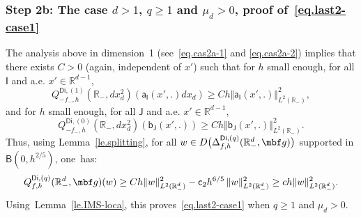 \subsubsection*{Step 2b: The case $d>1$, $q \ge 1$ and $\mu_{d}>0$, proof of~\eqref{eq.last2-case1}}
The analysis above in dimension~1 (see~\eqref{eq.cas2a-1} and
\eqref{eq.cas2a-2}) implies that there exists $C>0$ (again,
independent of $x'$) such that for $h$ small enough, for all $\mathsf I$ and a.e. $x'\in \mathbb R^{d-1}$,
\[
Q^{\mathsf{Di},(1)}_{-f_-,h}(\mathbb R_-,dx_d^2) (\mathsf a_{\mathsf I}(x',.)dx_d) \ge Ch \Vert \mathsf a_{\mathsf I}(x',.) \Vert_{L^2(\mathbb R_-)}^2,
\]
and for $h$ small enough, for all $\mathsf J$ and a.e. $x'\in \mathbb R^{d-1}$,
\[
Q^{\mathsf{Di},(0)}_{-f_-,h}(\mathbb R_-,dx_d^2) (\mathsf b_{\mathsf J}(x',.)) \ge Ch \Vert \mathsf b_{\mathsf J}(x',.) \Vert_{L^2(\mathbb R_-)}^2.
\]
Thus, using Lemma~\ref{le.splitting}, for all $w\in D\bigl(\Delta_{f,h}^{\mathsf{Di},(q)}(\mathbb R_-^d, \mbf g) \bigr)$ supported in $\mathsf B(0,h^{2/5 })$, one~has:
\[
Q^{\mathsf{Di},(q)}_{f,h}(\mathbb R_-^d, \mbf g)(w)\ge Ch \Vert w \Vert_{L^2(\mathbb R^d_-)}^2-\mathsf c_2h^{6/5}\, \Vert w \Vert_{L^2(\mathbb R^d_-)}^2\ge ch \Vert w \Vert_{L^2(\mathbb R^d_-)}^2.
\]
Using~Lemma~\ref{le.IMS-loca}, this proves~\eqref{eq.last2-case1} when $q\ge 1$ and $\mu_{d}>0$.

